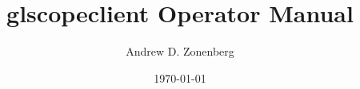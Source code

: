 \documentclass[11pt,letterpaper]{book}
\begin{document}
\title{glscopeclient Operator Manual}
\author{Andrew D. Zonenberg}
\date{\today}

\maketitle


\frontmatter

\mainmatter
\tableofcontents

\raggedbottom






%

\FloatBarrier










\end{document}
